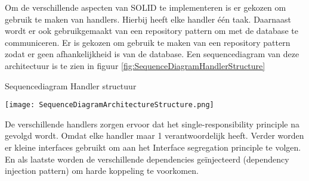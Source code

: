 \whitespace
Om de verschillende aspecten van SOLID te implementeren is er gekozen om gebruik te maken van handlers.
Hierbij heeft elke handler één taak.
Daarnaast wordt er ook gebruikgemaakt van een repository pattern om met de database te communiceren.
Er is gekozen om gebruik te maken van een repository pattern zodat er geen afhankelijkheid is van de database.
Een sequencediagram van deze architectuur is te zien in figuur \ref{fig:SequenceDiagramHandlerStructure}

\begin{graphic}
    \captionsetup{type=figure}
    \caption{Sequencediagram Handler structuur}
    \texttt{[image: SequenceDiagramArchitectureStructure.png]}
    \label{fig:SequenceDiagramHandlerStructure}
\end{graphic}

\whitespace
De verschillende handlers zorgen ervoor dat het single-responsibility principle na gevolgd wordt.
Omdat elke handler maar 1 verantwoordelijk heeft.
Verder worden er kleine interfaces gebruikt om aan het Interface segregation principle te volgen.
En als laatste worden de verschillende dependencies geïnjecteerd (dependency injection pattern) om harde koppeling te voorkomen.
